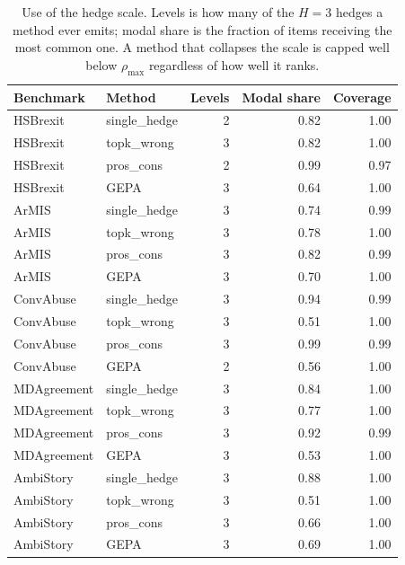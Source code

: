 \begin{table}[t]
\centering
\small
\begin{tabular}{llrrr}
\hline
Benchmark & Method & Levels & Modal share & Coverage \\
\hline
HSBrexit & single\_hedge & 2 & 0.82 & 1.00 \\
HSBrexit & topk\_wrong & 3 & 0.82 & 1.00 \\
HSBrexit & pros\_cons & 2 & 0.99 & 0.97 \\
HSBrexit & GEPA & 3 & 0.64 & 1.00 \\
ArMIS & single\_hedge & 3 & 0.74 & 0.99 \\
ArMIS & topk\_wrong & 3 & 0.78 & 1.00 \\
ArMIS & pros\_cons & 3 & 0.82 & 0.99 \\
ArMIS & GEPA & 3 & 0.70 & 1.00 \\
ConvAbuse & single\_hedge & 3 & 0.94 & 0.99 \\
ConvAbuse & topk\_wrong & 3 & 0.51 & 1.00 \\
ConvAbuse & pros\_cons & 3 & 0.99 & 0.99 \\
ConvAbuse & GEPA & 2 & 0.56 & 1.00 \\
MDAgreement & single\_hedge & 3 & 0.84 & 1.00 \\
MDAgreement & topk\_wrong & 3 & 0.77 & 1.00 \\
MDAgreement & pros\_cons & 3 & 0.92 & 0.99 \\
MDAgreement & GEPA & 3 & 0.53 & 1.00 \\
AmbiStory & single\_hedge & 3 & 0.88 & 1.00 \\
AmbiStory & topk\_wrong & 3 & 0.51 & 1.00 \\
AmbiStory & pros\_cons & 3 & 0.66 & 1.00 \\
AmbiStory & GEPA & 3 & 0.69 & 1.00 \\
\hline
\end{tabular}
\caption{Use of the hedge scale. Levels is how many of the $H=3$ hedges a method ever emits; modal share is the fraction of items receiving the most common one. A method that collapses the scale is capped well below $\rho_{\max}$ regardless of how well it ranks.}
\label{tab:stability}
\end{table}